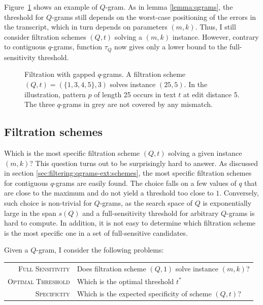Figure~\ref{fig:qgrams-gapped} shows an example of $Q$-gram.
As in lemma \ref{lemma:qgrams}, the threshold for $Q$-grams still depends on the worst-case positioning of the errors in the transcript, which in turn depends on parameters $(m,k)$.
Thus, I still consider filtration schemes $(Q,t)$ solving a $(m,k)$ instance.
However, contrary to contiguous $q$-grams, function $\tau_Q$ now gives only a lower bound to the full-sensitivity threshold.

\begin{figure}[t]
\begin{center}
\caption[Filtration with gapped $q$-grams]{Filtration with gapped $q$-grams. A filtration scheme $(Q,t) = (\{1, 3, 4, 5\},3)$ solves instance $(25,5)$. In the illustration, pattern $p$ of length 25 occurs in text $t$ at edit distance 5. The three $q$-grams in grey are not covered by any mismatch.}
\label{fig:qgrams-gapped}

\end{center}
\end{figure}


\subsection{Filtration schemes}
\label{sub:qgram:design}

Which is the most specific filtration scheme $(Q,t)$ solving a given instance $(m,k)$?
This question turns out to be surprisingly hard to answer.
As discussed in section \ref{sec:filtering:qgrams-ext:schemes}, the most specific filtration schemes for contiguous $q$-grams are easily found.
The choice falls on a few values of $q$ that are close to the maximum and do not yield a threshold too close to $1$.
Conversely, such choice is non-trivial for $Q$-grams, as the search space of $Q$ is exponentially large in the span $s(Q)$ and a full-sensitivity threshold for arbitrary $Q$-grams is hard to compute.
In addition, it is not easy to determine which filtration scheme is the most specific one in a set of full-sensitive candidates.

Given a $Q$-gram, I consider the following problems:
\begin{table}[h]
\begin{tabular}{rl}
\textsc{Full Sensitivity} & Does filtration scheme $(Q,1)$ solve instance $(m,k)$?\\
\textsc{Optimal Threshold} & Which is the optimal threshold $t^*$ \st $(Q,t^*)$ solves $(m,k)$?\\
\textsc{Specificity} & Which is the expected specificity of scheme $(Q,t)$?\\
\end{tabular}
\end{table}

